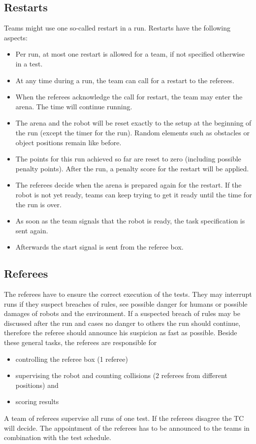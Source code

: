 \subsection{Restarts}
Teams might use one so-called restart in a run. Restarts have the following aspects:

\begin{itemize}

	\item Per run, at most one restart is allowed for a team, if not specified 			otherwise in a test.
	\item At any time during a run, the team can call for a restart to the 				referees.
	\item When the referees acknowledge the call for restart, the team may enter the 			arena. The time will continue running.
	\item The arena and the robot will be reset exactly to the setup at the 				beginning of the run (except the timer for the run). Random elements such as 			obstacles or object positions remain like before.
	\item The points for this run achieved so far are reset to zero (including 			possible penalty points). After the run, a penalty score for the restart will 	be applied.
	\item The referees decide when the arena is prepared again for the restart. If 	the robot is not yet ready, teams can keep trying to get it ready until the 			time for the run is over.
	\item As soon as the team signals that the robot is ready, the task 					specification is sent again.
	\item Afterwards the start signal is sent from the referee box.

\end{itemize}

\subsection{Referees}
The referees have to ensure the correct execution of the tests. They may interrupt runs if they suspect breaches of rules, see possible danger for humans or possible damages of robots and the environment. If a suspected breach of rules may be discussed after the run and cases no danger to others the run should continue, therefore the referee should  announce his suspicion as fast as possible. Beside these general tasks, the referees are responsible for
\begin{itemize}
\item controlling the referee box (1 referee)
\item supervising the robot and counting collisions (2 referees from different positions) and
\item scoring results
\end{itemize}
A team of referees supervise all runs of one test. If the referees disagree the TC will decide. The appointment of the referees has to be announced to the teams in combination with the test schedule.


